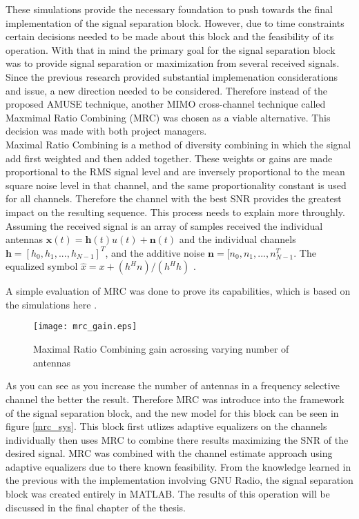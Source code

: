 


These simulations provide the necessary foundation to push towards the final implementation of the signal separation block.  However, due to time constraints certain decisions needed to be made about this block and the feasibility of its operation.  With that in mind the primary goal for the signal separation block was to provide signal separation or maximization from several received signals.  Since the previous research provided substantial implemenation considerations and issue, a new direction needed to be considered.  Therefore instead of the proposed AMUSE\cite{AMUSE} technique, another MIMO cross-channel technique called Maxmimal Ratio Combining (MRC) was chosen as a viable alternative.  This decision was made with both project managers.\\

Maximal Ratio Combining is a method of diversity combining in which the signal add first weighted and then added together.  These weights or gains are made proportional to the RMS signal level and are inversely proportional to the mean square noise level in that channel, and the same proportionality constant is used for all channels\cite{fs1037c}.  Therefore the channel with the best SNR provides the greatest impact on the resulting sequence.  This process needs to explain more throughly.  Assuming the received signal is an array of samples received the individual antennas \(\boldsymbol{x}(t)=\boldsymbol{h}(t)u(t)+\boldsymbol{n}(t)\) and the individual channels \(\boldsymbol{h}=[h_{0},h_{1},...,h_{N-1}]^{T}\), and the additive noise \(\boldsymbol{n}=[n_{0},n_{1},...,n_{N-1}^{T}\).  The equalized symbol \(\hat{x}=x+(h^{H}n)/(h^{H}h) \) \cite{diversity}.

A simple evaluation of MRC was done to prove its capabilities, which is based on the simulations here \cite{mrc_m}.

\begin{figure}[!ht] 
\centering
\texttt{[image: mrc\_gain.eps]}
\caption{Maximal Ratio Combining gain acrossing varying number of antennas}
\end{figure}

As you can see as you increase the number of antennas in a frequency selective channel the better the result.  Therefore MRC was introduce into the framework of the signal separation block, and the new model for this block can be seen in figure \ref{mrc_sys}.  This block first utlizes adaptive equalizers on the channels individually then uses MRC to combine there results maximizing the SNR of the desired signal.  MRC was combined with the channel estimate approach using adaptive equalizers due to there known feasibility.  From the knowledge learned in the previous with the implementation involving GNU Radio, the signal separation block was created entirely in MATLAB.  The results of this operation will be discussed in the final chapter of the thesis.\\

